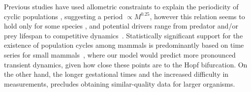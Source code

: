 \documentclass{pnastwo}
\begin{document}
\begin{article}
Previous studies have used allometric constraints to explain the periodicity
of cyclic populations
\cite{CalderIII:1983jd,Peterson:1984hj,Krukonis:1991fk}, suggesting a period
$\propto M^{0.25}$, however this relation seems to hold only for some species
\cite{Hendriks:2012fc}, and potential drivers range from predator and/or prey lifespan to competitive dynamics~\cite{Kendall:1999iy,Hogstedt:2005cr}.
Statistically significant support for the existence of population cycles
among mammals is predominantly based on time series for small
mammals~\cite{Kendall:1998hl}, where our model would predict more pronounced transient dynamics, given how close these points are to
the Hopf bifurcation.  On the other hand, the longer gestational times and
the increased difficulty in measurements, precludes obtaining similar-quality
data for larger organisms.
\vspace{6mm}


\end{article}
\end{document}
